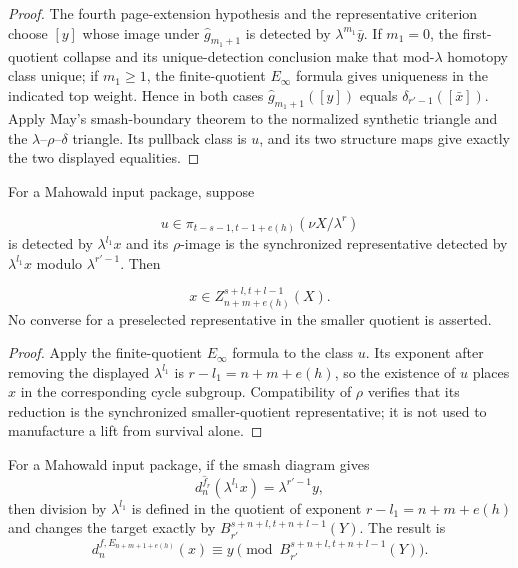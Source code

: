 \begin{proof}
  The fourth page-extension hypothesis and the representative criterion choose
  $[y]$ whose image under $\widehat g_{m_1+1}$ is detected by
  $\lambda^{m_1}\bar y$.  If $m_1=0$, the first-quotient collapse and its
  unique-detection conclusion make that mod-$\lambda$ homotopy class unique;
  if $m_1\ge1$, the finite-quotient $E_\infty$ formula gives uniqueness in the
  indicated top weight.  Hence in both cases
  $\widehat g_{m_1+1}([y])$ equals
  $\delta_{r'-1}([\bar x])$.  Apply May's smash-boundary theorem to the
  normalized synthetic triangle and the $\lambda$--$\rho$--$\delta$ triangle.
  Its pullback class is $u$, and its two structure maps give exactly the two
  displayed equalities.
\end{proof}

\begin{lemma}
  \label{lem:mahowald-quotient-lift-survival}
  \notready
  For a Mahowald input package, suppose

  \[
    u\in\pi_{t-s-1,t-1+e(h)}(\nu X/\lambda^r)
  \]
  is detected by $\lambda^{l_1}x$ and its $\rho$-image is the synchronized
  representative detected by $\lambda^{l_1}x$ modulo $\lambda^{r'-1}$.
  Then

  \[
    x\in Z_{n+m+e(h)}^{s+l,t+l-1}(X).
  \]
  No converse for a preselected representative in the smaller quotient is
  asserted.
\end{lemma}

\begin{proof}
  Apply the finite-quotient $E_\infty$ formula to the class $u$.  Its exponent
  after removing the displayed $\lambda^{l_1}$ is
  $r-l_1=n+m+e(h)$, so the existence of $u$ places $x$ in the corresponding
  cycle subgroup.  Compatibility of $\rho$ verifies that its reduction is the
  synchronized smaller-quotient representative; it is not used to manufacture
  a lift from survival alone.
\end{proof}

\begin{lemma}
  \label{lem:mahowald-lambda-division}
  \notready
  For a Mahowald input package, if the smash diagram gives
  \[
    d_n^{\widehat f_r}(\lambda^{l_1}x)=\lambda^{r'-1}y,
  \]
  then division by $\lambda^{l_1}$ is defined in the quotient of exponent
  $r-l_1=n+m+e(h)$ and changes the target exactly by
  $B_{r'}^{s+n+l,t+n+l-1}(Y)$.  The result is
  \[
    d_n^{f,E_{n+m+1+e(h)}}(x)
       \equiv y\pmod{B_{r'}^{s+n+l,t+n+l-1}(Y)}.
  \]
\end{lemma}

